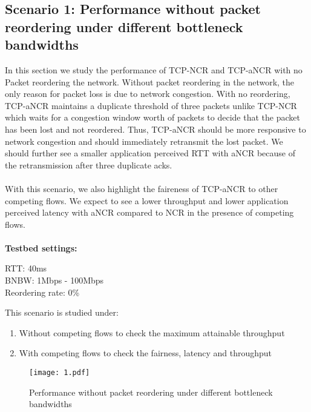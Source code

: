 \subsection{Scenario 1: Performance without packet reordering under different bottleneck bandwidths\label{ss:is1}}
In this section we study the performance of TCP-NCR and TCP-aNCR with no Packet reordering the network. Without packet reordering in the network, the only reason for packet loss is due to network congestion.
With no reordering, TCP-aNCR maintains a duplicate threshold of three packets unlike TCP-NCR which waits for a congestion window worth of packets to decide that the packet has been lost and not reordered.
Thus, TCP-aNCR should be more responsive to network congestion and should immediately retransmit the lost packet. We should further see a smaller application perceived RTT with aNCR because of the retransmission after three duplicate acks.
\\
\\
With this scenario, we also highlight the faireness of TCP-aNCR to other competing flows. We expect to see a lower throughput and lower application perceived latency with aNCR compared to NCR in the presence of competing flows.
\\
\\
\textbf{Testbed settings:}
\begin{tabbing}
\quad RTT: 40ms \\
\quad BNBW: 1Mbps - 100Mbps \\
\quad Reordering rate: 0\%
\end{tabbing}
This scenario is studied under:
\begin{enumerate}
    \item Without competing flows to check the maximum attainable throughput
    \item With competing flows to check the fairness, latency and throughput
\end{enumerate}

\begin{figure}
    \centering
    \texttt{[image: 1.pdf]}\\
    \caption{Performance without packet reordering under different bottleneck bandwidths}\label{fig:1_i}
\end{figure}

